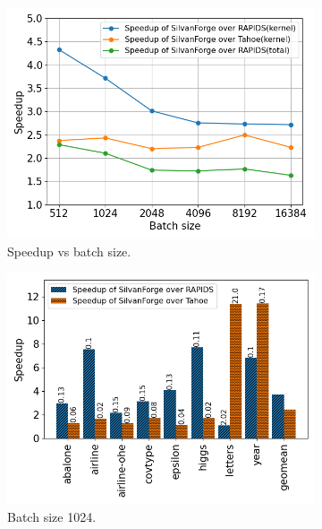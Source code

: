 \begin{figure}[htb]
    \begin{subfigure}[t]{.32\linewidth}
      \includegraphics[width=\textwidth]{figures/geomean_speedup_4060_kernel_time_total_time.png}
      \caption{\label{Fig:TBvsRAPIDSTahoe_4060_Speedup}Speedup vs batch size.}      
    \end{subfigure}
    \begin{subfigure}[t]{.32\linewidth}
      \includegraphics[width=\textwidth]{figures/speedup_bar_graph_1024.png}
      \caption{\label{Fig:KernelTimeIndividualBenchmarks4060a} Batch size 1024.}
    \end{subfigure}
    \begin{subfigure}[t]{.32\linewidth}

\end{subfigure}
\end{figure}
